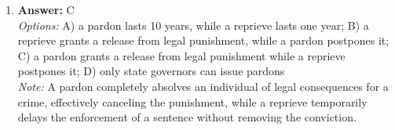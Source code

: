 \documentclass[12pt]{article}
\begin{document}
\begin{enumerate}[label=\arabic*.]
\\ \textit{Note:} The Supreme Court has employed selective incorporation through the Fourteenth Amendment's Due Process Clause to extend most protections outlined in the Bill of Rights to apply to state laws, thereby ensuring that individual rights are safeguarded from infringement by state governments.
\item \textbf{Answer:} C
\\ \textit{Options:} A) a pardon lasts 10 years, while a reprieve lasts one year; B) a reprieve grants a release from legal punishment, while a pardon postpones it; C) a pardon grants a release from legal punishment while a reprieve postpones it; D) only state governors can issue pardons
\\ \textit{Note:} A pardon completely absolves an individual of legal consequences for a crime, effectively canceling the punishment, while a reprieve temporarily delays the enforcement of a sentence without removing the conviction.
\end{enumerate}
\end{document}
